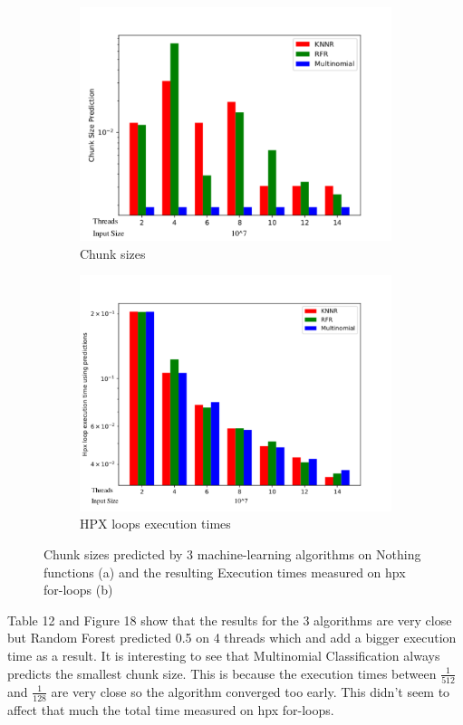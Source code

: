 \begin{figure}[h]
	\centering
	\begin{subfigure}[b]{0.5\textwidth}
		\centering
		\includegraphics[width=\textwidth]{images/bars_nothing_cs.pdf}
		\caption[Network2]%
		{{Chunk sizes}}    
	\end{subfigure}
	\hfill
	\begin{subfigure}[b]{0.49\textwidth}  
		\centering 
		\includegraphics[width=\textwidth]{images/bars_nothing_times.pdf}
		\caption[]%
		{{HPX loops execution times}}    
	\end{subfigure}
	\caption{Chunk sizes predicted by 3 machine-learning algorithms on Nothing functions (a) and the resulting Execution times measured on hpx for-loops (b)} 	
\end{figure}
Table 12 and Figure 18 show that the results for the 3 algorithms are very close but Random Forest predicted 0.5 on 4 threads which and add a bigger execution time as a result. It is interesting to see that Multinomial Classification always predicts the smallest chunk size. This is because the execution times between $\frac{1}{512}$ and $\frac{1}{128}$ are very close so the algorithm converged too early. This didn't seem to affect that much the total time measured on hpx for-loops.
\newpage
